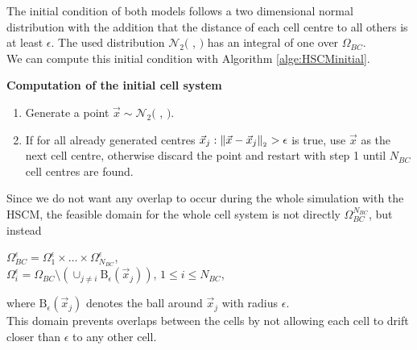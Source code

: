 The initial condition of both models follows a two dimensional normal distribution with the addition that the distance of each cell centre to all others is at least $\epsilon$.  
The used distribution $\mathcal{N}_2($ 
\scalebox{0.7}{$\begin{pmatrix} 0 \\ 0 \end{pmatrix}$}, 
\scalebox{0.7}{$\begin{pmatrix} 0.09^2 & 0 \\ 0 & 0.09^2 \end{pmatrix}$}
$)$ has an integral of one over $\Omega_{BC}$. \\
We can compute this initial condition with Algorithm \ref{alge:HSCMinitial}.
\begin{algorithm} \textbf{Computation of the initial cell system} \label{alge:HSCMinitial}
	\begin{enumerate} 
		\item Generate a point $\vec{x} \sim \mathcal{N}_2($ 
            \scalebox{0.7}{$\begin{pmatrix} 0 \\ 0 \end{pmatrix}$}, 
            \scalebox{0.7}{$\begin{pmatrix} 0.09^2 & 0 \\ 0 & 0.09^2 \end{pmatrix}$}
            $)$. 
		\item If for all already generated centres $\vec{x}_j: \norm[\vec{x} - \vec{x}_j] > \epsilon$ is true, use $\vec{x}$ as the next cell centre, otherwise discard the point and restart with step 1 until $N_{BC}$ cell centres are found. 
	\end{enumerate}	
\end{algorithm}

Since we do not want any overlap to occur during the whole simulation with the HSCM, the feasible domain for the whole cell system is not directly $\Omega_{BC}^{N_{BC}}$, but instead 
\begin{center}
    $\Omega_{BC}^{\epsilon} = \Omega_1^{\epsilon} \times \ldots \times \Omega_{N_{BC}}^{\epsilon}$, \\
    $\Omega_{i}^{\epsilon} = \Omega_{BC} \setminus ( \cup_{j \neq i} \mathrm{B}_{\epsilon}(\vec{x}_j))$, \hspace{0.5em} $1 \leq i \leq N_{BC}$,
\end{center}
where $\mathrm{B}_{\epsilon}(\vec{x}_j)$ denotes the ball around $\vec{x}_j$ with radius $\epsilon$. \\
This domain prevents overlaps between the cells by not allowing each cell to drift closer than $\epsilon$ to any other cell.  

